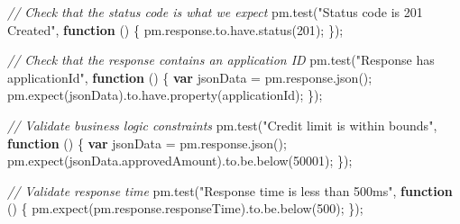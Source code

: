 \documentclass[
  11pt,
  openany,
  oneside]{book}
\newenvironment{Shaded}{}{}
\newcommand{\AttributeTok}[1]{\textcolor[rgb]{0.49,0.56,0.16}{#1}}
\newcommand{\CommentTok}[1]{\textcolor[rgb]{0.38,0.63,0.69}{\textit{#1}}}
\newcommand{\DecValTok}[1]{\textcolor[rgb]{0.25,0.63,0.44}{#1}}
\newcommand{\FunctionTok}[1]{\textcolor[rgb]{0.02,0.16,0.49}{#1}}
\newcommand{\KeywordTok}[1]{\textcolor[rgb]{0.00,0.44,0.13}{\textbf{#1}}}
\newcommand{\NormalTok}[1]{#1}
\newcommand{\OperatorTok}[1]{\textcolor[rgb]{0.40,0.40,0.40}{#1}}
\newcommand{\StringTok}[1]{\textcolor[rgb]{0.25,0.44,0.63}{#1}}
\begin{document}
\begin{Shaded}
\begin{Highlighting}[]
\CommentTok{// Check that the status code is what we expect}
\NormalTok{pm}\OperatorTok{.}\FunctionTok{test}\NormalTok{(}\StringTok{"Status code is 201 Created"}\OperatorTok{,} \KeywordTok{function}\NormalTok{ () \{}
\NormalTok{    pm}\OperatorTok{.}\AttributeTok{response}\OperatorTok{.}\AttributeTok{to}\OperatorTok{.}\AttributeTok{have}\OperatorTok{.}\FunctionTok{status}\NormalTok{(}\DecValTok{201}\NormalTok{)}\OperatorTok{;}
\NormalTok{\})}\OperatorTok{;}

\CommentTok{// Check that the response contains an application ID}
\NormalTok{pm}\OperatorTok{.}\FunctionTok{test}\NormalTok{(}\StringTok{"Response has applicationId"}\OperatorTok{,} \KeywordTok{function}\NormalTok{ () \{}
    \KeywordTok{var}\NormalTok{ jsonData }\OperatorTok{=}\NormalTok{ pm}\OperatorTok{.}\AttributeTok{response}\OperatorTok{.}\FunctionTok{json}\NormalTok{()}\OperatorTok{;}
\NormalTok{    pm}\OperatorTok{.}\FunctionTok{expect}\NormalTok{(jsonData)}\OperatorTok{.}\AttributeTok{to}\OperatorTok{.}\AttributeTok{have}\OperatorTok{.}\FunctionTok{property}\NormalTok{(}\StringTok{\textquotesingle{}applicationId\textquotesingle{}}\NormalTok{)}\OperatorTok{;}
\NormalTok{\})}\OperatorTok{;}

\CommentTok{// Validate business logic constraints}
\NormalTok{pm}\OperatorTok{.}\FunctionTok{test}\NormalTok{(}\StringTok{"Credit limit is within bounds"}\OperatorTok{,} \KeywordTok{function}\NormalTok{ () \{}
    \KeywordTok{var}\NormalTok{ jsonData }\OperatorTok{=}\NormalTok{ pm}\OperatorTok{.}\AttributeTok{response}\OperatorTok{.}\FunctionTok{json}\NormalTok{()}\OperatorTok{;}
\NormalTok{    pm}\OperatorTok{.}\FunctionTok{expect}\NormalTok{(jsonData}\OperatorTok{.}\AttributeTok{approvedAmount}\NormalTok{)}\OperatorTok{.}\AttributeTok{to}\OperatorTok{.}\AttributeTok{be}\OperatorTok{.}\FunctionTok{below}\NormalTok{(}\DecValTok{50001}\NormalTok{)}\OperatorTok{;}
\NormalTok{\})}\OperatorTok{;}

\CommentTok{// Validate response time}
\NormalTok{pm}\OperatorTok{.}\FunctionTok{test}\NormalTok{(}\StringTok{"Response time is less than 500ms"}\OperatorTok{,} \KeywordTok{function}\NormalTok{ () \{}
\NormalTok{    pm}\OperatorTok{.}\FunctionTok{expect}\NormalTok{(pm}\OperatorTok{.}\AttributeTok{response}\OperatorTok{.}\AttributeTok{responseTime}\NormalTok{)}\OperatorTok{.}\AttributeTok{to}\OperatorTok{.}\AttributeTok{be}\OperatorTok{.}\FunctionTok{below}\NormalTok{(}\DecValTok{500}\NormalTok{)}\OperatorTok{;}
\NormalTok{\})}\OperatorTok{;}
\end{Highlighting}
\end{Shaded}
\end{document}
